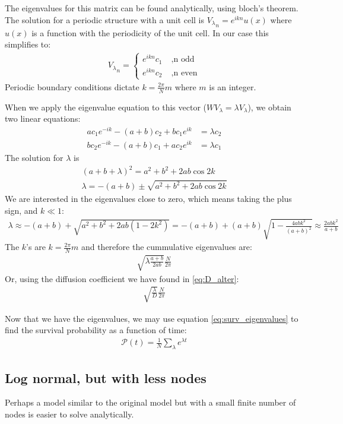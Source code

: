 \documentclass[onecolumn,fleqn]{revtex4}
\begin{document}
The eigenvalues for this matrix can be found analytically, using bloch's theorem. The solution for a periodic structure with a unit cell is ${V_\lambda}_n = e^{ikn} u(x)$ where $u(x)$ is a function with the periodicity of the unit cell. In our case this simplifies to:
\begin{align}
{V_\lambda}_n = \begin{cases}e^{ikn} c_1 \; &, \text{n odd} \\ e^{ikn} c_2 \; &, \text{n even} \end{cases}
\end{align}
Periodic boundary conditions dictate $k=\frac{2\pi}{N}m$ where $m$ is an integer.

When we apply the eigenvalue equation to this vector ($WV_\lambda = \lambda V_\lambda$), we obtain two linear equations:
\begin{align}
ac_1e^{-ik}   -(a+b)c_2 +bc_1e^{ik} &= \lambda c_2 \\
bc_2e^{-ik}   -(a+b)c_1 +ac_2e^{ik} &= \lambda c_1 
\end{align}
The solution for $\lambda$ is
\begin{align}
(a+b+\lambda)^2 = a^2+b^2+2ab\cos 2k \\
\lambda = -(a + b) \pm \sqrt{a^2+b^2+2ab\cos 2k}  \label{eq:abab_eigenvals}
\end{align}
We are interested in the eigenvalues close to zero, which means taking the plus sign, and $k\ll 1$:
\begin{align}
\lambda \approx -(a + b) + \sqrt{a^2+b^2+2ab(1-2k^2)} = -(a+b) +(a+b)\sqrt{1 - \frac{4abk^2}{(a+b)^2}}\approx \frac{2abk^2}{a+b}
\end{align}
The $k$'s are $k=\frac{2\pi}{N}m$ and therefore the cummulative eigenvalues are:
\begin{align}
\sqrt{\lambda\frac{a+b}{2ab}}\frac{N}{2\pi}
\end{align}
Or, using the diffusion coefficient we have found in \eqref{eq:D_alter}:
\begin{align}
\sqrt{\frac{\lambda}{D}}\frac{N}{2\pi}
\end{align}

Now that we have the eigenvalues, we may use equation \ref{eq:surv_eigenvalues} to find the survival probability as a function of time:
\begin{align}
\mathcal{P}(t) =\frac{1}{N}\sum_\lambda e^{\lambda t} 
\end{align}

\subsection{Log normal, but with less nodes}
Perhaps a model similar to the original model but with a small finite number of nodes is easier to solve analytically.
\end{document}
